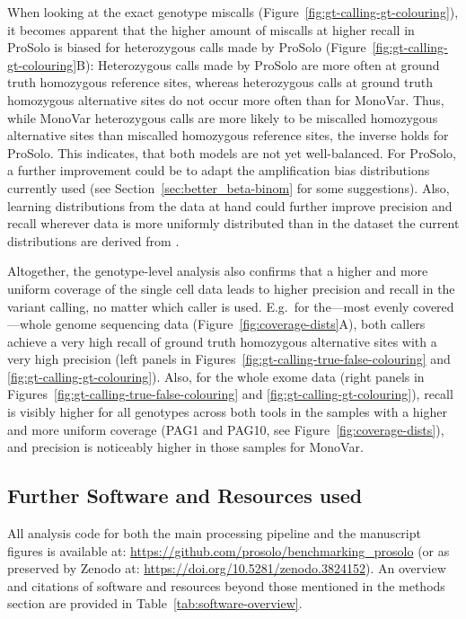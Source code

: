 \documentclass[authoryear,preprint,11pt]{scrartcl}
\begin{document}
When looking at the exact genotype miscalls (Figure~\ref{fig:gt-calling-gt-colouring}), it becomes apparent that the higher amount of miscalls at higher recall in ProSolo is biased for heterozygous calls made by ProSolo (Figure~\ref{fig:gt-calling-gt-colouring}B):
Heterozygous calls made by ProSolo are more often at ground truth homozygous reference sites, whereas heterozygous calls at ground truth homozygous alternative sites do not occur more often than for MonoVar.
Thus, while MonoVar heterozygous calls are more likely to be miscalled homozygous alternative sites than miscalled homozygous reference sites, the inverse holds for ProSolo.
This indicates, that both models are not yet well-balanced.
For ProSolo, a further improvement could be to adapt the amplification bias distributions currently used (see Section~\ref{sec:better_beta-binom} for some suggestions).
Also, learning distributions from the data at hand could further improve precision and recall wherever data is more uniformly distributed than in the dataset the current distributions are derived from \citep{lodato_somatic_2015}.

Altogether, the genotype-level analysis also confirms that a higher and more uniform coverage of the single cell data leads to higher precision and recall in the variant calling, no matter which caller is used.
E.g.~for the---most evenly covered---whole genome sequencing data (Figure~\ref{fig:coverage-dists}A), both callers achieve a very high recall of ground truth homozygous alternative sites with a very high precision (left panels in Figures~\ref{fig:gt-calling-true-false-colouring} and \ref{fig:gt-calling-gt-colouring}).
Also, for the whole exome data (right panels in Figures~\ref{fig:gt-calling-true-false-colouring} and \ref{fig:gt-calling-gt-colouring}), recall is visibly higher for all genotypes across both tools in the samples with a higher and more uniform coverage (PAG1 and PAG10, see Figure~\ref{fig:coverage-dists}), and precision is noticeably higher in those samples for MonoVar.

\subsection{Further Software and Resources used}

All analysis code for both the main processing pipeline and the manuscript figures is available at: \url{https://github.com/prosolo/benchmarking_prosolo} (or as preserved by Zenodo at: \url{https://doi.org/10.5281/zenodo.3824152}).
An overview and citations of software and resources beyond those mentioned in the methods section are provided in Table~\ref{tab:software-overview}.
\end{document}
